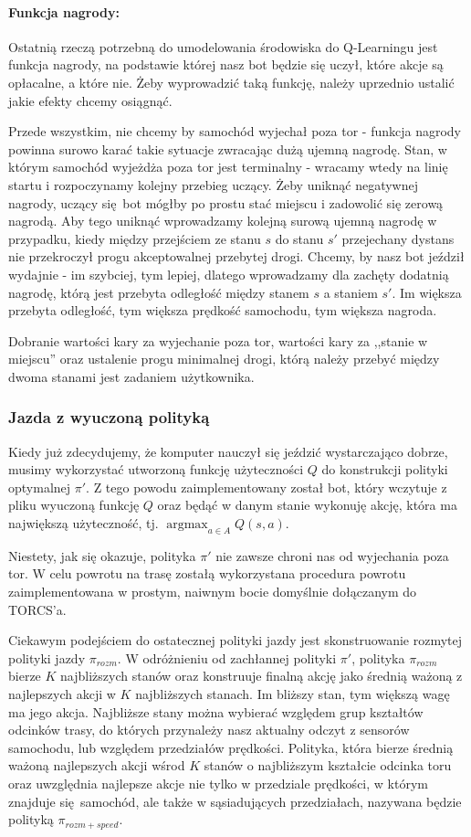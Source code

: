 \documentclass{article}
\DeclareMathOperator{\argmax}{argmax}
\begin{document}
\paragraph{Funkcja nagrody:}
Ostatnią rzeczą potrzebną do umodelowania środowiska do Q-Learningu jest funkcja nagrody, na podstawie której nasz bot będzie się uczył, które akcje są opłacalne, a które nie. Żeby wyprowadzić taką funkcję, należy uprzednio ustalić jakie efekty chcemy osiągnąć. 

Przede wszystkim, nie chcemy by samochód wyjechał poza tor - funkcja nagrody powinna surowo karać takie sytuacje zwracając dużą ujemną nagrodę. Stan, w którym samochód wyjeżdża poza tor jest terminalny - wracamy wtedy na linię startu i rozpoczynamy kolejny przebieg uczący. Żeby uniknąć negatywnej nagrody, uczący się bot mógłby po prostu stać miejscu i zadowolić się zerową nagrodą. Aby tego uniknąć wprowadzamy kolejną surową ujemną nagrodę w przypadku, kiedy między przejściem ze stanu $s$ do stanu $s'$ przejechany dystans nie przekroczył progu akceptowalnej przebytej drogi. Chcemy, by nasz bot jeździł wydajnie - im szybciej, tym lepiej, dlatego wprowadzamy dla zachęty dodatnią nagrodę, którą jest przebyta odległość między stanem $s$ a staniem $s'$. Im większa przebyta odległość, tym większa prędkość samochodu, tym większa nagroda.

Dobranie wartości kary za wyjechanie poza tor, wartości kary za ,,stanie w miejscu'' oraz ustalenie progu minimalnej drogi, którą należy przebyć między dwoma stanami jest zadaniem użytkownika.

\subsubsection{Jazda z wyuczoną polityką}
Kiedy już zdecydujemy, że komputer nauczył się jeździć wystarczająco dobrze, musimy wykorzystać utworzoną funkcję użyteczności $Q$ do konstrukcji polityki optymalnej $\pi'$. Z tego powodu zaimplementowany został bot, który wczytuje z pliku wyuczoną funkcję $Q$ oraz będąć w danym stanie wykonuję akcję, która ma największą użyteczność, tj. $\argmax_{a \in A} Q(s, a)$.

Niestety, jak się okazuje, polityka $\pi'$ nie zawsze chroni nas od wyjechania poza tor. W celu powrotu na trasę zostałą wykorzystana procedura powrotu zaimplementowana w prostym, naiwnym bocie domyślnie dołączanym do TORCS'a.

Ciekawym podejściem do ostatecznej polityki jazdy jest skonstruowanie rozmytej polityki jazdy $\pi_{rozm}$. W odróżnieniu od zachłannej polityki $\pi'$, polityka $\pi_{rozm}$ bierze $K$ najbliższych stanów oraz konstruuje finalną akcję jako średnią ważoną z najlepszych akcji w $K$ najbliższych stanach. Im bliższy stan, tym większą wagę ma jego akcja. Najbliższe stany można wybierać względem grup kształtów odcinków trasy, do których przynależy nasz aktualny odczyt z sensorów samochodu, lub względem przedziałów prędkości. Polityka, która bierze średnią ważoną najlepszych akcji wśrod $K$ stanów o najbliższym kształcie odcinka toru oraz uwzględnia najlepsze akcje nie tylko w przedziale prędkości, w którym znajduje się samochód, ale także w sąsiadujących przedziałach, nazywana będzie polityką $\pi_{rozm+speed}$.
\end{document}
